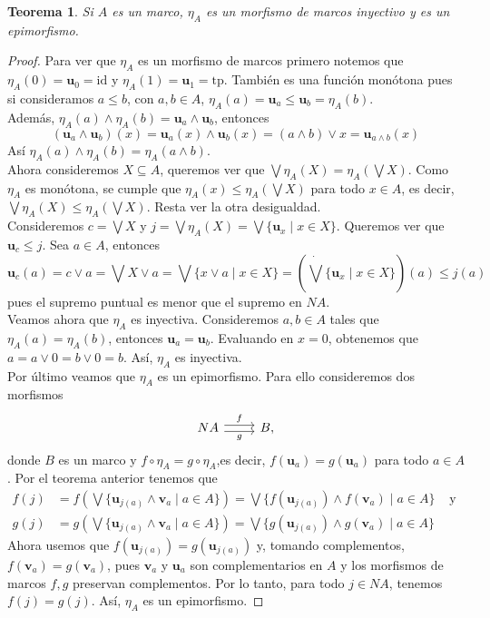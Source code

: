 \documentclass[12pt,letterpaper,titlepage]{article}
\newtheorem{thm}{Teorema}
\theoremstyle{definition}
\newcommand\Sup{\bigvee}
\newcommand\unuc[1]{\mathbf u_{#1}}
\newcommand\vnuc[1]{\mathbf v_{#1}}
\newcommand\<{\langle}
\renewcommand\>{\rangle}
\newcommand{\id}{\mathrm{id}}
\newcommand{\tp}{\mathrm{tp}}
\begin{document}
\begin{thm}
  Si $A$ es un marco, $\eta_A$ es un morfismo de marcos inyectivo
  y es un epimorfismo.
\end{thm}
\begin{proof}
Para ver que $\eta_A$ es un morfismo de marcos primero notemos que $\eta_A(0)=\unuc 0=\id$ y $\eta_A(1)=\unuc 1=\tp$. También es una función monótona pues si consideramos $a\leq b$, con $a,b\in A$, $\eta_A(a)=\unuc a\leq \unuc b=\eta_A(b)$.\\
Además, $\eta_A(a)\wedge\eta_A(b)=\unuc a\wedge \unuc b$, entonces $$(\unuc a\wedge \unuc b)(x)=\unuc a(x)\wedge \unuc b(x)=(a\wedge b)\vee x=\unuc {a\wedge b}(x)$$
Así $\eta_A(a)\wedge \eta_A(b)=\eta_A(a\wedge b).$\\
Ahora consideremos $X\subseteq A$, queremos ver que $\bigvee\eta_A(X)=\eta_A(\bigvee X)$. Como $\eta_A$ es monótona, se cumple que $\eta_A(x)\leq \eta_A(\bigvee X)$ para todo $x\in A$, es decir, $\bigvee\eta_A (X)\leq \eta_A(\bigvee X).$ Resta ver la otra desigualdad.\\
Consideremos $c=\bigvee X$ y $j=\bigvee \eta_A(X)=\bigvee\{ \unuc x\mid x\in X\}.$ Queremos ver que $\unuc c\leq j$. Sea $a\in A$, entonces $$\unuc c(a)=c\vee a=\bigvee X\vee a=\bigvee\{x\vee a\mid x\in X\}=\left(\dot{\bigvee}\{\unuc x\mid x\in X\}\right)(a)\leq j(a)$$
pues el supremo puntual es menor que el supremo en $NA.$\\
Veamos ahora que $\eta_A$ es inyectiva. Consideremos $a,b\in A$ tales que $\eta_A(a)=\eta_A(b)$, entonces $\unuc a=\unuc b$. Evaluando en $x=0$, obtenemos que $a=a\vee 0=b\vee 0=b$. Así, $\eta_A$ es inyectiva.\\
Por último veamos que $\eta_A$ es un epimorfismo. Para ello consideremos dos morfismos 
\[\begin{tikzcd}
	{NA} \ar[r,"f",shift left] \ar[r,"g"',shift right] & {B},
\end{tikzcd}\]
donde $B$ es un marco y $f\circ\eta_A=g\circ\eta_A$,es decir, $f(\unuc a)=g(\unuc a)$ para todo $a\in A$. Por el teorema anterior tenemos que 
\begin{align*}
    f(j)
    &= f\left(\bigvee\{\unuc {j(a)}\wedge \vnuc a\mid a\in A\}\right)
    =\Sup\{f(\unuc {j(a)})\wedge f(\vnuc a)\mid a\in A\} & \mbox{ y } \\
    g(j)
    &= g\left(\bigvee\{\unuc {j(a)}\wedge \vnuc a\mid a\in A\}\right)
    = \Sup\{g(\unuc {j(a)})\wedge g(\vnuc a)\mid a\in A\} & 
\end{align*}
Ahora usemos que $f(\unuc {j(a)})=g(\unuc {j(a)})$ y,
tomando complementos, $f(\vnuc a)=g(\vnuc a)$, pues $\vnuc a$ y $\unuc a$
son complementarios en $A$ y los morfismos de marcos $f,g$
preservan complementos.
Por lo tanto, para todo $j\in NA$, tenemos $f(j)=g(j)$.
Así, $\eta_A$ es un epimorfismo.
\end{proof}
\end{document}
